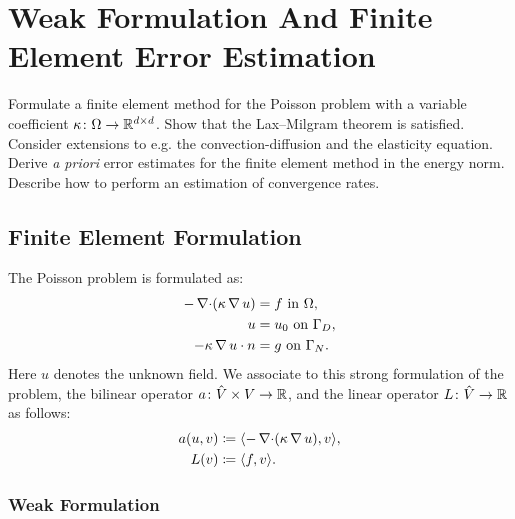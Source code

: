 
\chapter[Poisson Equation]{Weak Formulation And Finite Element Error Estimation}

\begin{problem_text}
    Formulate a finite element method for the Poisson problem with a variable
    coefficient \( \kappa \colon \Omega \to \mathbb{R}^{d\times d}\). Show that the
    Lax--Milgram theorem is satisfied. Consider extensions to e.g. the
    convection-diffusion and the elasticity equation. Derive \emph{a priori}
    error estimates for the finite element method in the energy norm. Describe
    how to perform an estimation of convergence rates.
\end{problem_text}

\section{Finite Element Formulation}

The Poisson problem is formulated as:
\begin{align}
    -\operatorname{\mathop{}\!\nabla \cdot} (\kappa \operatorname{\mathop{}\!\nabla} u) &= f \text { in } \Omega,\\
    u &= u_0 \text{ on } \Gamma_D,\\
    -\kappa \operatorname{\mathop{}\!\nabla} u \cdot n &= g \text{ on } \Gamma_N.
\end{align}
Here \( u \) denotes the unknown field. We associate to this strong formulation
of the problem, the bilinear operator \( a\colon \hat{V} \times V \to \mathbb{R}\),
and the linear operator \( L \colon \hat{V} \to \mathbb{R}\) as follows:
\begin{align}
    a(u, v) &\coloneqq \langle -\operatorname{\mathop{}\!\nabla \cdot}(\kappa \operatorname{\mathop{}\!\nabla} u), v \rangle, \\
    L(v) &\coloneqq \langle f, v \rangle.
\end{align}

\subsection{Weak Formulation}
\label{sub:weak_formulation}

